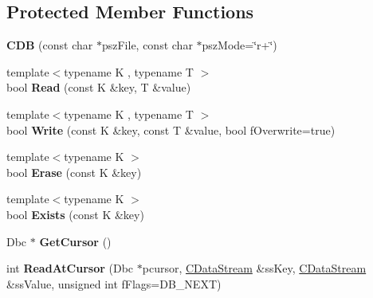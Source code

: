 \subsection*{Protected Member Functions}
\begin{DoxyCompactItemize}
\item 
\mbox{\label{class_c_d_b_a913f57290431ac54c92bd2e034571291}} 
{\bfseries C\+DB} (const char $\ast$psz\+File, const char $\ast$psz\+Mode=\char`\"{}r+\char`\"{})
\item 
\mbox{\label{class_c_d_b_adfd2c079df629d5f7cac0ca923ffd698}} 
{\footnotesize template$<$typename K , typename T $>$ }\\bool {\bfseries Read} (const K \&key, T \&value)
\item 
\mbox{\label{class_c_d_b_a7fb5b4fa36e57e17287f2c1c762bd708}} 
{\footnotesize template$<$typename K , typename T $>$ }\\bool {\bfseries Write} (const K \&key, const T \&value, bool f\+Overwrite=true)
\item 
\mbox{\label{class_c_d_b_a3f7e1ba9dd41de3fb1525d789405a6c3}} 
{\footnotesize template$<$typename K $>$ }\\bool {\bfseries Erase} (const K \&key)
\item 
\mbox{\label{class_c_d_b_a5f7d7854dcbcec1b1f85bc6a0008563e}} 
{\footnotesize template$<$typename K $>$ }\\bool {\bfseries Exists} (const K \&key)
\item 
\mbox{\label{class_c_d_b_a5ea1cb8e2f2e9ad357d5e37619eabed2}} 
Dbc $\ast$ {\bfseries Get\+Cursor} ()
\item 
\mbox{\label{class_c_d_b_aa3f7c529fd233c106dca32845b593232}} 
int {\bfseries Read\+At\+Cursor} (Dbc $\ast$pcursor, \mbox{\hyperlink{class_c_data_stream}{C\+Data\+Stream}} \&ss\+Key, \mbox{\hyperlink{class_c_data_stream}{C\+Data\+Stream}} \&ss\+Value, unsigned int f\+Flags=D\+B\+\_\+\+N\+E\+XT)
\end{DoxyCompactItemize}
